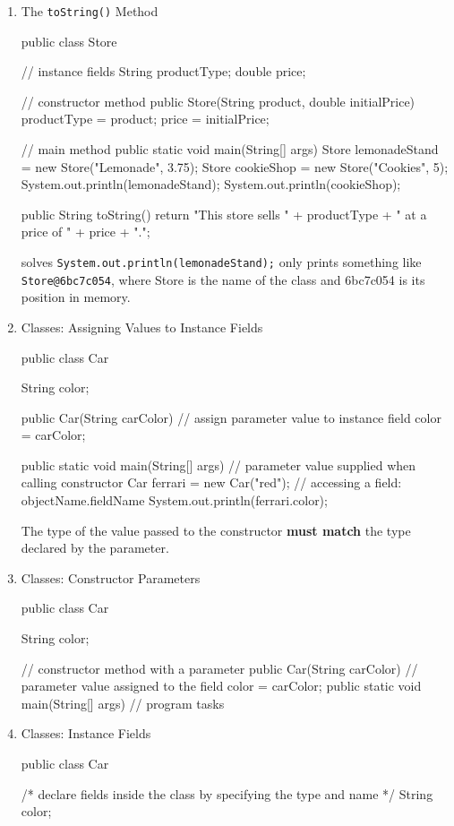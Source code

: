 \documentclass[a4paper,12pt]{article}
\begin{document}
\begin{enumerate}
\item The \verb|toString()| Method
\begin{javacode}
public class Store {
  // instance fields
  String productType;
  double price;
  
  // constructor method
  public Store(String product, double initialPrice) {
    productType = product;
    price = initialPrice;
  }

  // main method
  public static void main(String[] args) {
    Store lemonadeStand = new Store("Lemonade", 3.75);
    Store cookieShop = new Store("Cookies", 5);
    System.out.println(lemonadeStand);
    System.out.println(cookieShop);
  }
  	
  public String toString() {
    return "This store sells " + productType + " at a price of " + price + ".";
  }
}
\end{javacode}
solves \verb|System.out.println(lemonadeStand);| only prints something like \verb|Store@6bc7c054|, where Store is the name of the class and 6bc7c054 is its position in memory.

\item Classes: Assigning Values to Instance Fields
\begin{javacode}
public class Car {
  String color;

  public Car(String carColor) {
    // assign parameter value to instance field
    color = carColor;
  }

  public static void main(String[] args) {
    // parameter value supplied when calling constructor
    Car ferrari = new Car("red");
		// accessing a field: objectName.fieldName
    System.out.println(ferrari.color);
  }
}
\end{javacode}
The type of the value passed to the constructor \textbf{must match} the type declared by the parameter.

\item Classes: Constructor Parameters
\begin{javacode}
public class Car {
  String color;

  // constructor method with a parameter
  public Car(String carColor) {
    // parameter value assigned to the field
    color = carColor;
  }
  public static void main(String[] args) {
    // program tasks
  }
}
\end{javacode}

\item Classes: Instance Fields
\begin{javacode}
public class Car {
  /*
  declare fields inside the class
  by specifying the type and name
  */
  String color;

}
\end{javacode}
\end{enumerate}
\end{document}

